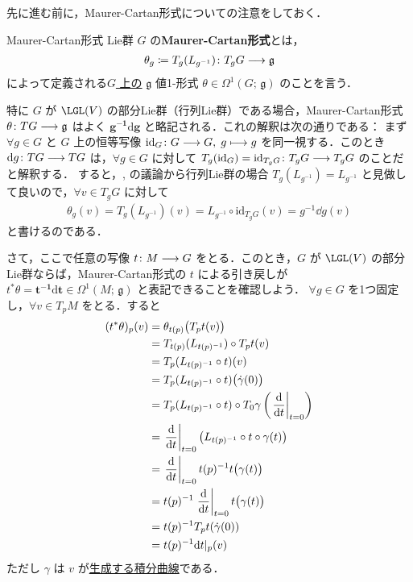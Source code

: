 \documentclass[TQFT_main]{subfiles}
\begin{document}
先に進む前に，Maurer-Cartan形式についての注意をしておく．

\begin{mydef}[label=def:Maurer-Cartan]{Maurer-Cartan形式}
    Lie群 $G$ の\textbf{Maurer-Cartan形式}とは，
    \begin{align}
        \theta_g \coloneqq T_g(L_{g^{-1}}) \colon T_g G \longrightarrow \mathfrak{g}
    \end{align}
    によって定義される\underline{$G$ 上の} $\mathfrak{g}$ 値1-形式 $\theta \in \Omega^1(G;\, \mathfrak{g})$ のことを言う．
\end{mydef}
特に $G$ が $\LGL (V)$ の部分Lie群（行列Lie群）である場合，Maurer-Cartan形式 $\theta \colon TG \longrightarrow \mathfrak{g}$ はよく $\bm{g^{-1} \mathrm{d} g}$ と略記される．これの解釈は次の通りである：
まず $\forall g \in G$ と $G$ 上の恒等写像 $\mathrm{id}_G \colon G \longrightarrow G,\; g \longmapsto g$ を同一視する．このとき $\dd g \colon TG \longrightarrow TG$ は，$\forall g \in G$ に対して $T_g (\mathrm{id}_G) = \mathrm{id}_{T_g G} \colon T_g G \longrightarrow T_g G$ のことだと解釈する．
すると，, の議論から行列Lie群の場合 $T_g(L_{g^{-1}}) = L_{g^{-1}}$ と見做して良いので，$\forall v \in T_g G$ に対して
\begin{align}
    \theta_g(v) = T_g(L_{g^{-1}})(v) = L_{g^{-1}} \circ \mathrm{id}_{T_g G}(v) = g^{-1} \dd g(v)
\end{align}
と書けるのである．

さて，ここで任意の\cinfty 写像 $t \colon M \longrightarrow G$ をとる．このとき，$G$ が $\LGL (V)$ の部分Lie群ならば，Maurer-Cartan形式の $t$ による引き戻しが $t^* \theta = \bm{t^{-1} \mathrm{d} t} \in \Omega^1(M;\, \mathfrak{g})$ と表記できることを確認しよう．
$\forall g \in G$ を1つ固定し，$\forall v \in T_p M$ をとる．すると
\begin{align}
    (t^* \theta)_p (v)
    &= \theta_{t(p)} \bigl( T_p t (v) \bigr) \\
    &= T_{t(p)} (L_{t(p)^{-1}}) \circ T_p t (v) \\
    &= T_p (L_{t(p)^{-1}} \circ t)(v) \\
    &= T_p (L_{t(p)^{-1}} \circ t)\bigl(\dot{\gamma}(0)\bigr) \\
    &= T_p (L_{t(p)^{-1}} \circ t) \circ T_0 \gamma \left( \eval{\dv{}{t}}_{t=0} \right) \\
    &= \eval{\dv{}{t}}_{t=0} \bigl( L_{t(p)^{-1}} \circ t \circ \gamma(t) \bigr) \\
    &= \eval{\dv{}{t}}_{t=0} t(p)^{-1} t \bigl( \gamma(t) \bigr) \\
    &= t(p)^{-1} \eval{\dv{}{t}}_{t=0} t\bigl( \gamma(t) \bigr) \\
    &= t(p)^{-1} T_p t (\dot{\gamma}(0)) \\
    &= t(p)^{-1} \dd t|_p (v)
\end{align}
ただし $\gamma$ は $v$ が\hyperref[thm:fundamental-flow]{生成する積分曲線}である．
\end{document}
